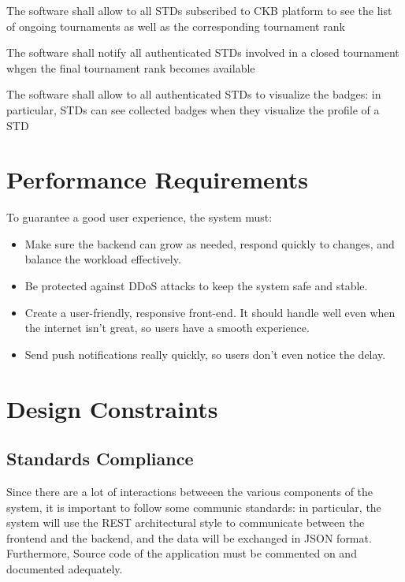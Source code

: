 \begin{requirementsenumerate}
        \item The software shall allow to all STDs subscribed to CKB platform to see the list of ongoing tournaments as well as the corresponding tournament rank  
        \item The software shall notify all authenticated STDs involved in a closed tournament whgen the final tournament rank becomes available
        \item The software shall allow to all authenticated STDs to visualize the badges: in particular, STDs can see collected badges when they visualize the profile of a STD
\end{requirementsenumerate}


\section{Performance Requirements}
To guarantee a good user experience, the system must:

\begin{itemize}
    \item Make sure the backend can grow as needed, respond quickly to changes, and balance the workload effectively.
    \item Be protected against DDoS attacks to keep the system safe and stable.
    \item Create a user-friendly, responsive front-end. It should handle well even when the internet isn't great, so users have a smooth experience.
    \item Send push notifications really quickly, so users don't even notice the delay.
\end{itemize}

\section{Design Constraints}

\subsection*{Standards Compliance}
Since there are a lot of interactions betweeen the various components of the system, it is important to follow some communic standards:
in particular, the system will use the REST architectural style to communicate between the frontend and the backend, and the data will be exchanged in JSON format.\\
Furthermore, Source code of the application must be commented on and documented adequately.\\

